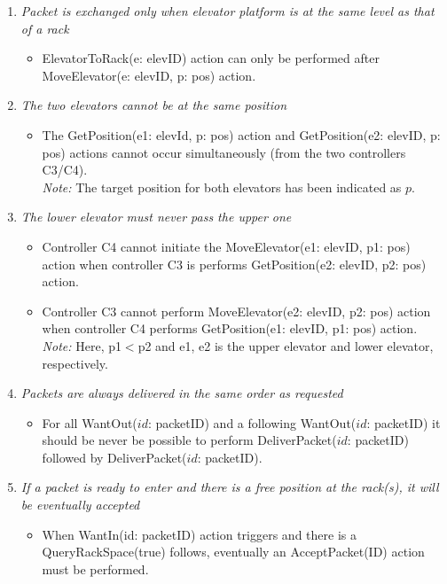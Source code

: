 \begin{enumerate}
\item \textit{Packet is exchanged only when elevator platform is at the same level as that of a rack}
	\begin{itemize}
	\item ElevatorToRack(e: elevID) action can only be performed after
	MoveElevator(e: elevID, p: pos) action.
	\end{itemize}
	
\item \textit{The two elevators cannot be at the same position}
	\begin{itemize}
	\item The GetPosition(e1: elevId, p: pos) action and
	GetPosition(e2: elevID, p: pos) actions cannot occur
	simultaneously (from the two controllers C3/C4).\\
	\textit{Note:} The target position for both elevators has been
	indicated as $p$.
	\end{itemize}
		
\item \textit{The lower elevator must never pass the upper one}
	\begin{itemize}
	\item Controller C4 cannot initiate the MoveElevator(e1: elevID, p1: pos) action when controller C3 is performs GetPosition(e2: elevID, p2: pos) action.
	\item Controller C3 cannot perform MoveElevator(e2: elevID, p2: pos) 
	action when controller C4 performs GetPosition(e1: elevID, p1: pos) 
	action.\\
	\textit{Note:} Here, p1$<$p2 and e1, e2 is the upper elevator and 
	lower elevator, respectively.
	\end{itemize}
	
\item \textit{Packets are always delivered in the same order as
	requested}	
	\begin{itemize}
	\item 
	For all WantOut($id$: packetID) and a following WantOut($id$: 
	packetID) it should be never be possible to perform
	DeliverPacket($id$: packetID) followed by DeliverPacket($id$: 
	packetID).
	\end{itemize}
	
\item \textit{If a packet is ready to enter and there is a free
	position at the rack(s), it will be eventually accepted}
	\begin{itemize}
	\item When WantIn(id: packetID) action triggers and there is a 
	QueryRackSpace(true) follows, eventually an AcceptPacket(ID) action 
	must be performed. 
	\end{itemize}
	

\end{enumerate}
